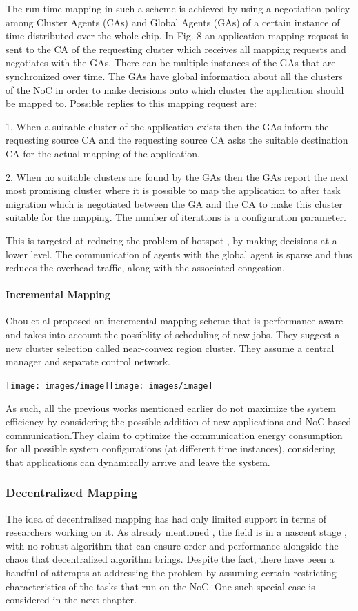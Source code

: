 The run-time mapping in such a scheme is achieved by using a negotiation
policy among Cluster Agents (CAs) and Global Agents (GAs) of a certain
instance of time distributed over the whole chip. In Fig. 8 an application
mapping request is sent to the CA of the requesting cluster which
receives all mapping requests and negotiates with the GAs. There can
be multiple instances of the GAs that are synchronized over time.
The GAs have global information about all the clusters of the NoC
in order to make decisions onto which cluster the application should
be mapped to. Possible replies to this mapping request are: 

1. When a suitable cluster of the application exists then the GAs
inform the requesting source CA and the requesting source CA asks
the suitable destination CA for the actual mapping of the application. 

2. When no suitable clusters are found by the GAs then the GAs report
the next most promising cluster where it is possible to map the application
to after task migration which is negotiated between the GA and the
CA to make this cluster suitable for the mapping. The number of iterations
is a configuration parameter. 

This is targeted at reducing the problem of hotspot , by making decisions
at a lower level. The communication of agents with the global agent
is sparse and thus reduces the overhead traffic, along with the associated
congestion.


\paragraph{Incremental Mapping}

Chou et al \cite{4627545} proposed an incremental mapping scheme
that is performance aware and takes into account the possiblity of
scheduling of new jobs. They suggest a new cluster selection called
near-convex region cluster. They assume a central manager and separate
control network.

\texttt{[image: images/image]}\texttt{[image: images/image]}

As such, all the previous works mentioned earlier do not maximize
the system efficiency by considering the possible addition of new
applications and NoC-based communication.They claim to optimize the
communication energy consumption for all possible system configurations
(at different time instances), considering that applications can dynamically
arrive and leave the system. 


\subsubsection{Decentralized Mapping}

The idea of decentralized mapping has had only limited support in
terms of researchers working on it. As already mentioned , the field
is in a nascent stage , with no robust algorithm that can ensure order
and performance alongside the chaos that decentralized algorithm brings.
Despite the fact, there have been a handful of attempts at addressing
the problem by assuming certain restricting characteristics of the
tasks that run on the NoC. One such special case is considered in
the next chapter.
